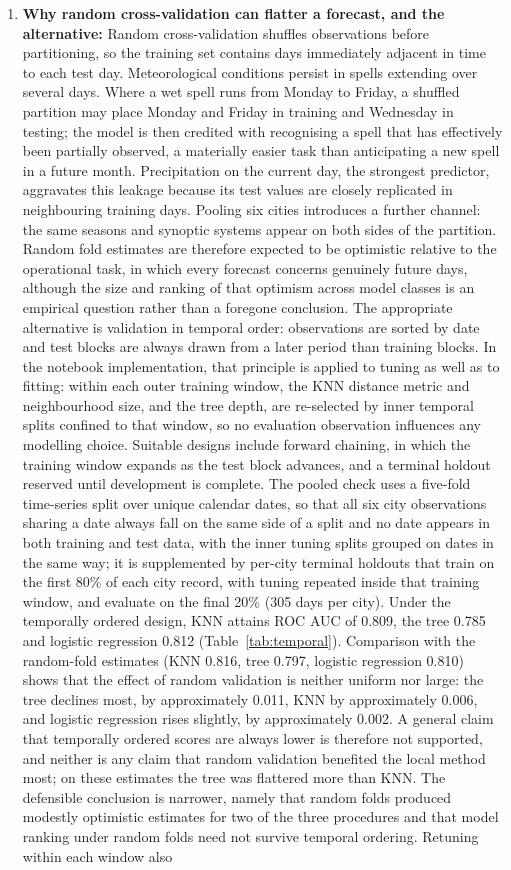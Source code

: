 \documentclass[conference]{IEEEtran}
\begin{document}
\begin{enumerate}
    \item \textbf{Why random cross-validation can flatter a forecast, and the alternative:} Random cross-validation shuffles observations before partitioning, so the training set contains days immediately adjacent in time to each test day. Meteorological conditions persist in spells extending over several days. Where a wet spell runs from Monday to Friday, a shuffled partition may place Monday and Friday in training and Wednesday in testing; the model is then credited with recognising a spell that has effectively been partially observed, a materially easier task than anticipating a new spell in a future month. Precipitation on the current day, the strongest predictor, aggravates this leakage because its test values are closely replicated in neighbouring training days. Pooling six cities introduces a further channel: the same seasons and synoptic systems appear on both sides of the partition. Random fold estimates are therefore expected to be optimistic relative to the operational task, in which every forecast concerns genuinely future days, although the size and ranking of that optimism across model classes is an empirical question rather than a foregone conclusion. The appropriate alternative is validation in temporal order: observations are sorted by date and test blocks are always drawn from a later period than training blocks. In the notebook implementation, that principle is applied to tuning as well as to fitting: within each outer training window, the KNN distance metric and neighbourhood size, and the tree depth, are re-selected by inner temporal splits confined to that window, so no evaluation observation influences any modelling choice. Suitable designs include forward chaining, in which the training window expands as the test block advances, and a terminal holdout reserved until development is complete. The pooled check uses a five-fold time-series split over unique calendar dates, so that all six city observations sharing a date always fall on the same side of a split and no date appears in both training and test data, with the inner tuning splits grouped on dates in the same way; it is supplemented by per-city terminal holdouts that train on the first 80\% of each city record, with tuning repeated inside that training window, and evaluate on the final 20\% (305 days per city). Under the temporally ordered design, KNN attains ROC AUC of 0.809, the tree 0.785 and logistic regression 0.812 (Table~\ref{tab:temporal}). Comparison with the random-fold estimates (KNN 0.816, tree 0.797, logistic regression 0.810) shows that the effect of random validation is neither uniform nor large: the tree declines most, by approximately 0.011, KNN by approximately 0.006, and logistic regression rises slightly, by approximately 0.002. A general claim that temporally ordered scores are always lower is therefore not supported, and neither is any claim that random validation benefited the local method most; on these estimates the tree was flattered more than KNN. The defensible conclusion is narrower, namely that random folds produced modestly optimistic estimates for two of the three procedures and that model ranking under random folds need not survive temporal ordering. Retuning within each window also 
\end{enumerate}
\end{document}

